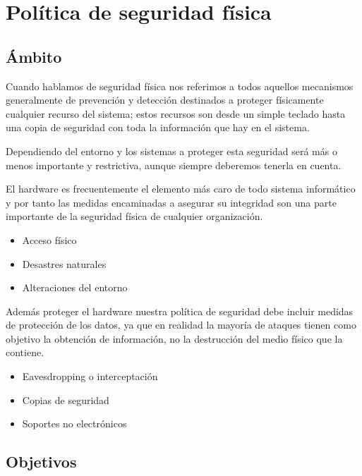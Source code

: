 \documentclass[11pt,bibtotoc,noliststotoc,BCOR0mm]{scrbook}
\begin{document}
\chapter{Política de seguridad física}
\label{ch:fisica}

\section{Ámbito}

Cuando hablamos de seguridad física nos referimos a todos aquellos mecanismos generalmente de prevención y detección destinados a proteger físicamente cualquier recurso del sistema; estos recursos son desde un simple teclado hasta una copia de seguridad con toda la información que hay en el sistema.

Dependiendo del entorno y los sistemas a proteger esta seguridad será más o menos importante y restrictiva, aunque siempre deberemos tenerla en cuenta.

El hardware es frecuentemente el elemento más caro de todo sistema informático y por tanto las medidas encaminadas a asegurar su integridad son una parte importante de la seguridad física de cualquier organización.
\begin{itemize}
\item Acceso físico
\item Desastres naturales
\item Alteraciones del entorno
\end{itemize}

Además proteger el hardware nuestra política de seguridad debe incluir medidas de protección de los datos, ya que en realidad la mayoría de ataques tienen como objetivo la obtención de información, no la destrucción del medio físico que la contiene.
\begin{itemize}
\item Eavesdropping o interceptación
\item Copias de seguridad
\item Soportes no electrónicos
\end{itemize}

\section{Objetivos}
\end{document}
